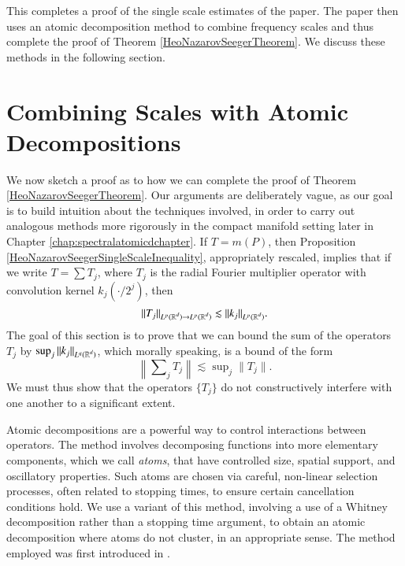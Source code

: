 This completes a proof of the single scale estimates of the paper. The paper then uses an atomic decomposition method to combine frequency scales and thus complete the proof of Theorem \ref{HeoNazarovSeegerTheorem}. We discuss these methods in the following section.

\section{Combining Scales with Atomic Decompositions} \label{sec:combiningscaleswithatomicdecompositions}

We now sketch a proof as to how we can complete the proof of Theorem \ref{HeoNazarovSeegerTheorem}. Our arguments are deliberately vague, as our goal is to build intuition about the techniques involved, in order to carry out analogous methods more rigorously in the compact manifold setting later in Chapter \ref{chap:spectralatomicdchapter}. If $T = m(P)$, then Proposition \ref{HeoNazarovSeegerSingleScaleInequality}, appropriately rescaled, implies that if we write $T = \sum T_j$, where $T_j$ is the radial Fourier multiplier operator with convolution kernel $k_j(\cdot/2^j)$, then
%
\begin{equation} \label{individualscaleoperatorbound}
    \| T_j \|_{L^p(\operatorname{\mathbb{R}}^d) \to L^p(\operatorname{\mathbb{R}}^d)} \lesssim \| k_j \|_{L^p(\operatorname{\mathbb{R}}^d)}.
\end{equation}
%
The goal of this section is to prove that we can bound the sum of the operators $T_j$ by $\sup_j \| k_j \|_{L^q(\operatorname{\mathbb{R}}^d)}$, which morally speaking, is a bound of the form
%
\begin{equation}
  \left\| \sum\nolimits_j T_j \right\| \lesssim \sup\nolimits_j \| T_j \|.
\end{equation}
%
We must thus show that the operators $\{ T_j \}$ do not constructively interfere with one another to a significant extent.

Atomic decompositions are a powerful way to control interactions between operators. The method involves decomposing functions into more elementary components, which we call \emph{atoms}, that have controlled size, spatial support, and oscillatory properties. Such atoms are chosen via careful, non-linear selection processes, often related to stopping times, to ensure certain cancellation conditions hold. We use a variant of this method, involving a use of a Whitney decomposition rather than a stopping time argument, to obtain an atomic decomposition where atoms do not cluster, in an appropriate sense. The method employed was first introduced in \cite{SeegerRemarks}.


